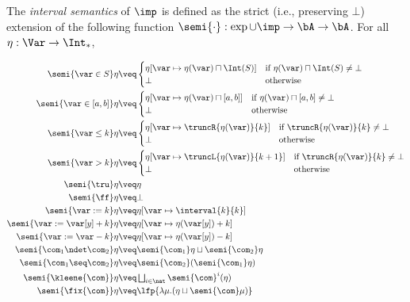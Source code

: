 The \emph{interval semantics} of \(\imp\) is defined as the strict
(i.e., preserving \(\bot\))
extension of the following function \(\semi{\cdot}: \exp \cup \imp \to
\bA \to \bA\). For all \(\eta: \Var \to \Int_*\),

\begin{align*}
  \semi{\var \in S}\eta 
  & \veq  
  \begin{cases}
    \eta[\var \mapsto \eta(\var)\sqcap \Int(S)]  & \text{if }\eta(\var)\sqcap \Int(S)\neq \bot \\
    \bot & \text{otherwise}
  \end{cases}\\
  \semi{\var \in [a,b]}\eta 
  & \veq  
  \begin{cases}
    \eta[\var \mapsto \eta(\var)\sqcap [a,b]]  & \text{if }\eta(\var)\sqcap [a,b]\neq \bot \\
    \bot & \text{otherwise}
  \end{cases}\\
  \semi{\var \leq k}\eta 
  & \veq 
  \begin{cases}
    \eta[\var \mapsto \truncR{\eta(\var)}{k}] & \text{if }\truncR{\eta(\var)}{k}\neq \bot \\
    \bot & \text{otherwise}
  \end{cases}\\
  \semi{\var > k}\eta 
  & \veq 
  \begin{cases}
    \eta[\var \mapsto \truncL{\eta(\var)}{k+1}] & \text{if }\truncR{\eta(\var)}{k}\neq \bot \\
    \bot & \text{otherwise}
  \end{cases}\\
  \semi{\tru}\eta 
  & \veq \eta\\
  \semi{\ff}\eta 
  & \veq \bot\\
  \semi{\var := k}\eta 
  & \veq \eta[\var \mapsto \interval{k}{k}]\\
  \semi{\var := \var[y] + k}\eta 
  & \veq \eta[\var \mapsto \eta (\var[y]) + k]\\
  \semi{\var := \var - k}\eta 
  & \veq \eta[\var \mapsto \eta (\var[y]) - k]\\
  \semi{\com_1 \ndet \com_2} \eta
  & \veq \semi{\com_1} \eta \sqcup \semi{\com_2} \eta\\
  \semi{\com_1 \seq \com_2} \eta
  & \veq \semi{\com_2} (\semi{\com_1} \eta)\\
  \semi{\kleene{\com}} \eta
  & \veq \textstyle \bigsqcup_{i \in \nat} \semi{\com}^i (\eta)\\
  \semi{\fix{\com}} \eta
  & \veq  \lfp{\lambda \mu. (\eta \sqcup \semi{\com} \mu)}
\end{align*}

